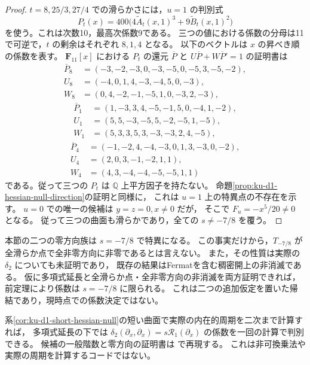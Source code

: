 \begin{proof}
$t=8,25/3,27/4$ での滑らかさには，$u=1$ の判別式
\[
 P_t(x)=400\bigl(4\widetilde A_t(x,1)^3+9\widetilde B_t(x,1)^2\bigr)
\]
を使う。これは次数10，最高次係数9である。
三つの値における係数の分母は11で可逆で，$t$ の剰余はそれぞれ $8,1,4$ となる。
以下のベクトルは $x$ の昇べき順の係数を表す。
$\mathbf F_{11}[x]$ における $P_t$ の還元 $\overline P$ と
$U\overline P+W\overline P'=1$ の証明書は
\[
 \begin{aligned}
 \overline P_8&=(-3,-2,-3,0,-3,-5,0,-5,3,-5,-2),\\
 U_8&=(-4,0,1,4,-3,-4,5,0,-3),\\
 W_8&=(0,4,-2,-1,-5,1,0,-3,2,-3),
 \end{aligned}
\]
\[
 \begin{aligned}
 \overline P_1&=(1,-3,3,4,-5,-1,5,0,-4,1,-2),\\
 U_1&=(5,5,-3,-5,5,-2,-5,1,-5),\\
 W_1&=(5,3,3,5,3,-3,-3,2,4,-5),
 \end{aligned}
\]
\[
 \begin{aligned}
 \overline P_4&=(-1,-2,4,-4,-3,0,1,3,-3,0,-2),\\
 U_4&=(2,0,3,-1,-2,1,1),\\
 W_4&=(4,3,-4,-4,-5,-5,1,1)
 \end{aligned}
\]
である。従って三つの $P_t$ は $\mathbb Q$ 上平方因子を持たない。
命題\ref{prop:ku-d1-hessian-null-direction}の証明と同様に，
これは $u=1$ 上の特異点の不存在を示す。
$u=0$ での唯一の候補は $y=z=0,x\ne0$ だが，
そこで $F_u=-x^5/20\ne0$ となる。
従って三つの曲面も滑らかであり，全ての $s\ne-7/8$ を覆う。
\end{proof}

\begin{remark}[残る値と実際の二次差]
\label{rem:ku-d1-exceptional-coefficient-scope}
本節の二つの零方向族は $s=-7/8$ で特異になる。
この事実だけから，$T_{-7/8}$ が全滑らか点で全非零方向に非零であるとは言えない。
また，その性質は実際の $\delta_2$ についても未証明であり，
既存の結果はFermatを含む稠密開上の非消滅である。
仮に多項式延長と全滑らか点・全非零方向の非消滅を両方証明できれば，
前定理により係数は $s=-7/8$ に限られる。
これは二つの追加仮定を置いた帰結であり，現時点での係数決定ではない。

系\ref{cor:ku-d1-short-hessian-null}の短い曲面で実際の内在的周期を二次まで計算すれば，
多項式延長の下では $\delta_2(\partial_x,\partial_x)=s\mathcal R_1(\partial_x)$
の係数を一回の計算で判別できる。
候補の一般階数と零方向の証明書は
で再現する。
これは非可換乗法や実際の周期を計算するコードではない。
\end{remark}
